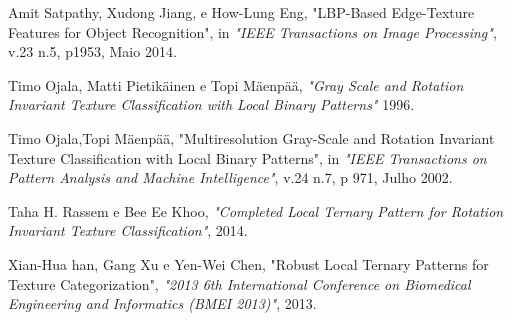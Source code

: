 \documentclass[a4paper,twocolumn]{article}
\begin{document}
\begin{thebibliography}{5}
      Amit Satpathy, Xudong Jiang, e How-Lung Eng,
      "LBP-Based Edge-Texture Features for Object Recognition",
      in \emph{"IEEE Transactions on Image Processing"},
      v.23 n.5,
      p1953,
      Maio 2014.

     Timo Ojala, Matti Pietikäinen e Topi Mäenpää,
     \emph{"Gray Scale and Rotation Invariant Texture Classification with Local Binary Patterns"}
     1996.
     
     Timo Ojala,Topi Mäenpää,
     "Multiresolution Gray-Scale and Rotation Invariant Texture Classification with Local Binary Patterns",
     in \emph{"IEEE Transactions on Pattern Analysis and Machine Intelligence"},
     v.24 n.7,
     p 971,
     Julho 2002.

     Taha H. Rassem e Bee Ee Khoo,
     \emph{"Completed Local Ternary Pattern for Rotation Invariant Texture Classification"},
     2014.
     
      
     Xian-Hua han, Gang Xu e Yen-Wei Chen,
     "Robust Local Ternary Patterns for Texture Categorization",
     \emph{"2013 6th International Conference on Biomedical Engineering and Informatics (BMEI 2013)"},
     2013.
     
     
     
\end{thebibliography}
\end{document}
